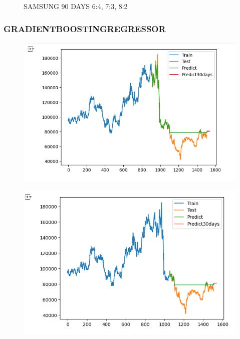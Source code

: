 \documentclass{article}
\begin{document}
\begin{multicols}{2}
\begin{figure}[H]
\begin{minipage}{0.15\textwidth}
    \label{fig:3}
    \end{minipage}
    \caption{SAMSUNG 90 DAYS  6:4, 7:3, 8:2 }
\end{figure}

\subsubsection{GRADIENTBOOSTINGREGRESSOR}
\begin{figure}[H]
    \centering
    \begin{minipage}{0.15\textwidth}
    \centering
    \includegraphics[width=1\textwidth]{Image/GradientBoosting/LG_30_6_4_GradientBoostingRegressor.png}
   
    \label{fig:1}
    \end{minipage}%
    \begin{minipage}{0.15\textwidth}
    \centering
    \includegraphics[width=1\textwidth]{Image/GradientBoosting/LG_30_7_3_GradientBoostingRegressor.png}
  

\end{minipage}
\end{figure}
\end{multicols}
\end{document}
